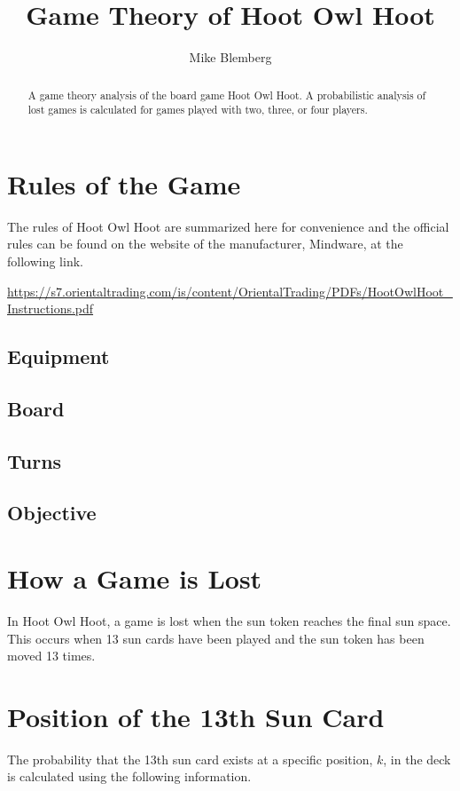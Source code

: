 \documentclass{article}
\begin{document}
    
\title{Game Theory of Hoot Owl Hoot}
\author{Mike Blemberg}
\maketitle

\begin{abstract}
A game theory analysis of the board game Hoot Owl Hoot.  A probabilistic analysis of lost games is calculated for games played with two, three, or four players.  
\end{abstract}

\section{Rules of the Game}
The rules of Hoot Owl Hoot are summarized here for convenience and the official rules can be found on the website of the manufacturer, Mindware, at the following link.

\url{https://s7.orientaltrading.com/is/content/OrientalTrading/PDFs/HootOwlHoot_Instructions.pdf}

\subsection{Equipment}

\subsection{Board}

\subsection{Turns}

\subsection{Objective}


\section{How a Game is Lost}
In Hoot Owl Hoot, a game is lost when the sun token reaches the final sun space.  This occurs when 13 sun cards have been played and the sun token has been moved 13 times.

\section{Position of the 13th Sun Card}
The probability that the 13th sun card exists at a specific position, $k$, in the deck is calculated using the following information.
\end{document}
